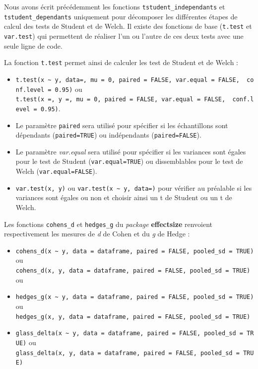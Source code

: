 \documentclass[
  11pt,
  french,
]{book}
\providecommand{\tightlist}{%
  \setlength{\itemsep}{0pt}\setlength{\parskip}{0pt}}
\begin{document}
Nous avons écrit précédemment les fonctions \texttt{tstudent\_independants} et \texttt{tstudent\_dependants} uniquement pour décomposer les différentes étapes de calcul des tests de Student et de Welch. Il existe des fonctions de base (\texttt{t.test} et \texttt{var.test}) qui permettent de réaliser l'un ou l'autre de ces deux tests avec une seule ligne de code.

La fonction \texttt{t.test} permet ainsi de calculer les test de Student et de Welch :

\begin{itemize}
\tightlist
\item
  \texttt{t.test(x\ \textasciitilde{}\ y,\ data=,\ mu\ =\ 0,\ paired\ =\ FALSE,\ var.equal\ =\ FALSE,\ \ conf.level\ =\ 0.95)} ou \texttt{t.test(x\ =,\ y\ =,\ mu\ =\ 0,\ paired\ =\ FALSE,\ var.equal\ =\ FALSE,\ \ conf.level\ =\ 0.95)}.
\item
  Le paramètre \texttt{paired} sera utilisé pour spécifier si les échantillons sont dépendants (\texttt{paired=TRUE}) ou indépendants (\texttt{paired=FALSE}).
\item
  Le paramètre \emph{var.equal} sera utilisé pour spécifier si les variances sont égales pour le test de Student (\texttt{var.equal=TRUE}) ou dissemblables pour le test de Welch (\texttt{var.equal=FALSE}).
\item
  \texttt{var.test(x,\ y)} ou \texttt{var.test(x\ \textasciitilde{}\ y,\ data=)} pour vérifier au préalable si les variances sont égales ou non et choisir ainsi un t de Student ou un t de Welch.
\end{itemize}

Les fonctions \texttt{cohens\_d} et \texttt{hedges\_g} du \emph{package} \textbf{effectsize} renvoient respectivement les mesures de \emph{d} de Cohen et du \emph{g} de Hedge :

\begin{itemize}
\item
  \texttt{cohens\_d(x\ \textasciitilde{}\ y,\ data\ =\ dataframe,\ paired\ =\ FALSE,\ pooled\_sd\ =\ TRUE)} ou \texttt{cohens\_d(x,\ y,\ data\ =\ dataframe,\ paired\ =\ FALSE,\ pooled\_sd\ =\ TRUE)} ou
\item
  \texttt{hedges\_g(x\ \textasciitilde{}\ y,\ data\ =\ dataframe,\ paired\ =\ FALSE,\ pooled\_sd\ =\ TRUE)} ou \texttt{hedges\_g(x,\ y,\ data\ =\ dataframe,\ paired\ =\ FALSE,\ pooled\_sd\ =\ TRUE)}
\item
  \texttt{glass\_delta(x\ \textasciitilde{}\ y,\ data\ =\ dataframe,\ paired\ =\ FALSE,\ pooled\_sd\ =\ TRUE)} ou \texttt{glass\_delta(x,\ y,\ data\ =\ dataframe,\ paired\ =\ FALSE,\ pooled\_sd\ =\ TRUE)}
\end{itemize}
\end{document}
